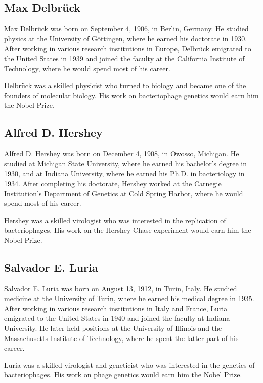 \subsection{Max Delbr\"uck}

Max Delbr\"uck was born on September 4, 1906, in Berlin, Germany. He studied physics at the University of G\"ottingen, where he earned his doctorate in 1930. After working in various research institutions in Europe, Delbr\"uck emigrated to the United States in 1939 and joined the faculty at the California Institute of Technology, where he would spend most of his career.

Delbr\"uck was a skilled physicist who turned to biology and became one of the founders of molecular biology. His work on bacteriophage genetics would earn him the Nobel Prize.

\subsection{Alfred D. Hershey}

Alfred D. Hershey was born on December 4, 1908, in Owosso, Michigan. He studied at Michigan State University, where he earned his bachelor's degree in 1930, and at Indiana University, where he earned his Ph.D. in bacteriology in 1934. After completing his doctorate, Hershey worked at the Carnegie Institution's Department of Genetics at Cold Spring Harbor, where he would spend most of his career.

Hershey was a skilled virologist who was interested in the replication of bacteriophages. His work on the Hershey-Chase experiment would earn him the Nobel Prize.

\subsection{Salvador E. Luria}

Salvador E. Luria was born on August 13, 1912, in Turin, Italy. He studied medicine at the University of Turin, where he earned his medical degree in 1935. After working in various research institutions in Italy and France, Luria emigrated to the United States in 1940 and joined the faculty at Indiana University. He later held positions at the University of Illinois and the Massachusetts Institute of Technology, where he spent the latter part of his career.

Luria was a skilled virologist and geneticist who was interested in the genetics of bacteriophages. His work on phage genetics would earn him the Nobel Prize.


